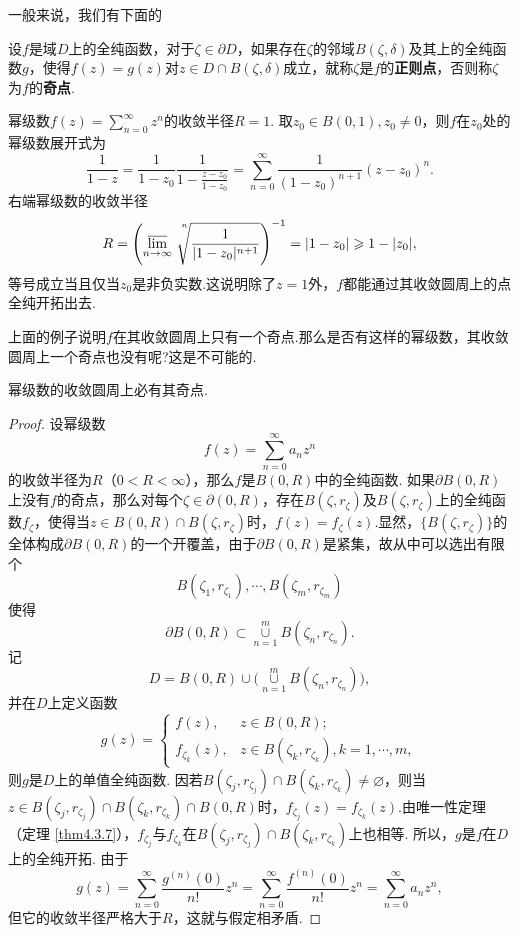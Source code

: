 一般来说，我们有下面的
\begin{definition}
设$f$是域$D$上的全纯函数，对于$\zeta\in\partial D$，如果存在$\zeta$的邻域$B(\zeta,\delta)$及其上的全纯函数$g$，使得$f(z)=g(z)$对$z\in D\cap B(\zeta,\delta)$成立，就称$\zeta$是$f$的\textbf{正则点}，否则称$\zeta$为$f$的\textbf{奇点}.
\end{definition}

\begin{example}\label{exam6.2.2}
幂级数$f(z)=\sum_{n=0}^\infty z^n$的收敛半径$R=1$. 取$z_0\in B(0,1),z_0\ne0$，则$f$在$z_0$处的幂级数展开式为
\[\frac1{1-z}=\frac1{1-z_0}\frac1{1-\frac{z-z_0}{1-z_0}}
=\sum_{n=0}^\infty\frac1{(1-z_0)^{n+1}}(z-z_0)^n.\]
右端幂级数的收敛半径
\[R=\left(\varlimsup_{n\to\infty}\sqrt[\leftroot{-4}\uproot{20}n]{\frac1{|1-z_0|^{n+1}}}
\right)^{-1}=|1-z_0|\ge1-|z_0|,\]
等号成立当且仅当$z_0$是非负实数.这说明除了$z=1$外，$f$都能通过其收敛圆周上的点全纯开拓出去.
\end{example}

上面的例子说明$f$在其收敛圆周上只有一个奇点.那么是否有这样的幂级数，其收敛圆周上一个奇点也没有呢?这是不可能的.
\begin{theorem}\label{thm6.2.3}
幂级数的收敛圆周上必有其奇点.
\end{theorem}
\begin{proof}
设幂级数
\[f(z)=\sum_{n=0}^\infty a_nz^n\]
的收敛半径为$R$（$0<R<\infty$），那么$f$是$B(0,R)$中的全纯函数.
如果$\partial B(0,R)$上没有$f$的奇点，那么对每个$\zeta\in\partial(0,R)$，存在$B(\zeta,r_\zeta)$及$B(\zeta,r_\zeta)$上的全纯函数$f_\zeta$，使得当$z\in B(0,R)\cap B(\zeta,r_\zeta)$时，$f(z)=f_\zeta(z)$.显然，$\{B(\zeta,r_\zeta)\}$的全体构成$\partial B(0,R)$的一个开覆盖，由于$\partial B(0,R)$是紧集，故从中可以选出有限个
\[B(\zeta_1,r_{\zeta_1}),\cdots,B(\zeta_m,r_{\zeta_m})\]
使得
\[\partial B(0,R)\subset\operatorname*{\cup}_{n=1}^m B(\zeta_n,r_{\zeta_n}).\]
记
\[D=B(0,R)\cup\big(\operatorname*{\cup}_{n=1}^mB(\zeta_n,r_{\zeta_n})\big),\]
并在$D$上定义函数
\[g(z)=\begin{cases}
f(z),&z\in B(0,R);\\
f_{\zeta_k}(z),&z\in B(\zeta_k,r_{\zeta_k}),k=1,\cdots,m,
\end{cases}\]
则$g$是$D$上的单值全纯函数. 因若$B(\zeta_j,r_{\zeta_j})\cap B(\zeta_k,r_{\zeta_k})
\ne\varnothing$，则当$z\in B(\zeta_j,r_{\zeta_j})\cap B(\zeta_k,r_{\zeta_k})\cap B(0,R)$时，$f_{\zeta_j}(z)=f_{\zeta_k}(z)$.由唯一性定理（定理 \ref{thm4.3.7}），$f_{\zeta_j}$与$f_{\zeta_k}$在$B(\zeta_j,r_{\zeta_j})\cap B(\zeta_k,r_{\zeta_k})$上也相等. 所以，$g$是$f$在$D$上的全纯开拓. 由于
\[g(z)=\sum_{n=0}^\infty \frac{g^{(n)}(0)}{n!}z^n=\sum_{n=0}^\infty
\frac{f^{(n)}(0)}{n!}z^n=\sum_{n=0}^\infty a_nz^n,\]
但它的收敛半径严格大于$R$，这就与假定相矛盾.
\end{proof}

